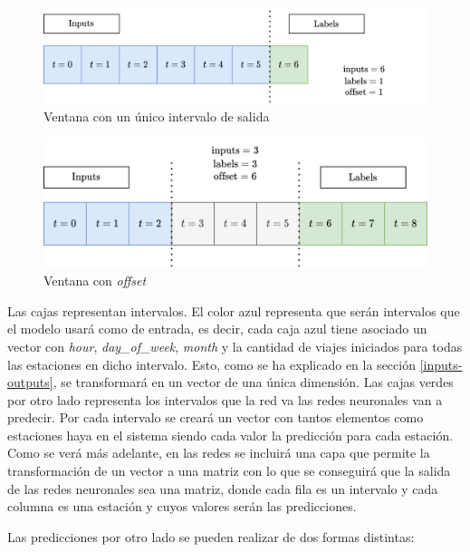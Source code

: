 \begin{figure}[H]
    \centering
    \includegraphics[width=12cm]{images/solution/modules/windows/windows-2.png}
    \caption{Ventana con un único intervalo de salida}
\end{figure}



\begin{figure}[H]
    \centering
    \includegraphics[width=12cm]{images/solution/modules/windows/windows-3.png}
    \caption{Ventana con \textit{offset}}
\end{figure}

Las cajas representan intervalos. El color azul representa que serán intervalos que el modelo usará como de entrada, es decir, cada caja azul tiene asociado un vector con \textit{hour}, \textit{day\_of\_week}, \textit{month} y la cantidad de viajes iniciados para todas las estaciones en dicho intervalo. Esto, como se ha explicado en la sección \ref{inputs-outputs}, se transformará en un vector de una única dimensión. Las cajas verdes por otro lado representa los intervalos que la red va las redes neuronales van a predecir. Por cada intervalo se creará un vector con tantos elementos como estaciones haya en el sistema siendo cada valor la predicción para cada estación. Como se verá más adelante, en las redes se incluirá una capa que permite la transformación de un vector a una matriz con lo que se conseguirá que la salida de las redes neuronales sea una matriz, donde cada fila es un intervalo y cada columna es una estación y cuyos valores serán las predicciones.
\newline


Las predicciones por otro lado se pueden realizar de dos formas distintas:

